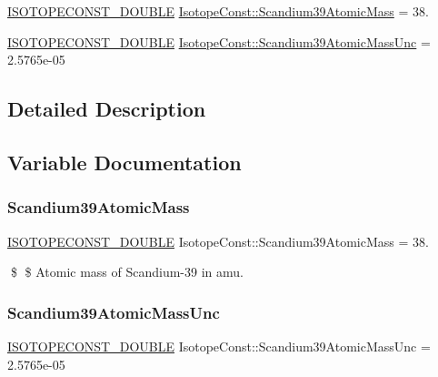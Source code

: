 \begin{DoxyCompactItemize}
\item 
\mbox{\hyperlink{group___isotope_const-_macros_ga8f45a7272ce02c0b4c65c44636ed719a}{I\+S\+O\+T\+O\+P\+E\+C\+O\+N\+S\+T\+\_\+\+D\+O\+U\+B\+LE}} \mbox{\hyperlink{group___isotope_const-_scandium-_sc39_ga57353dbb82be7fb82870cdfa821e84dc}{Isotope\+Const\+::\+Scandium39\+Atomic\+Mass}} = 38.
\item 
\mbox{\hyperlink{group___isotope_const-_macros_ga8f45a7272ce02c0b4c65c44636ed719a}{I\+S\+O\+T\+O\+P\+E\+C\+O\+N\+S\+T\+\_\+\+D\+O\+U\+B\+LE}} \mbox{\hyperlink{group___isotope_const-_scandium-_sc39_ga4d2ae7d7755924dd7aae0f30a4e42caa}{Isotope\+Const\+::\+Scandium39\+Atomic\+Mass\+Unc}} = 2.\+5765e-\/05
\end{DoxyCompactItemize}


\subsection{Detailed Description}


\subsection{Variable Documentation}
\mbox{\label{group___isotope_const-_scandium-_sc39_ga57353dbb82be7fb82870cdfa821e84dc}} 
\subsubsection{\texorpdfstring{Scandium39\+Atomic\+Mass}{Scandium39AtomicMass}}
{\footnotesize\ttfamily \mbox{\hyperlink{group___isotope_const-_macros_ga8f45a7272ce02c0b4c65c44636ed719a}{I\+S\+O\+T\+O\+P\+E\+C\+O\+N\+S\+T\+\_\+\+D\+O\+U\+B\+LE}} Isotope\+Const\+::\+Scandium39\+Atomic\+Mass = 38.}

\$ \$ Atomic mass of Scandium-\/39 in amu. \mbox{\label{group___isotope_const-_scandium-_sc39_ga4d2ae7d7755924dd7aae0f30a4e42caa}} 
\subsubsection{\texorpdfstring{Scandium39\+Atomic\+Mass\+Unc}{Scandium39AtomicMassUnc}}
{\footnotesize\ttfamily \mbox{\hyperlink{group___isotope_const-_macros_ga8f45a7272ce02c0b4c65c44636ed719a}{I\+S\+O\+T\+O\+P\+E\+C\+O\+N\+S\+T\+\_\+\+D\+O\+U\+B\+LE}} Isotope\+Const\+::\+Scandium39\+Atomic\+Mass\+Unc = 2.\+5765e-\/05}

